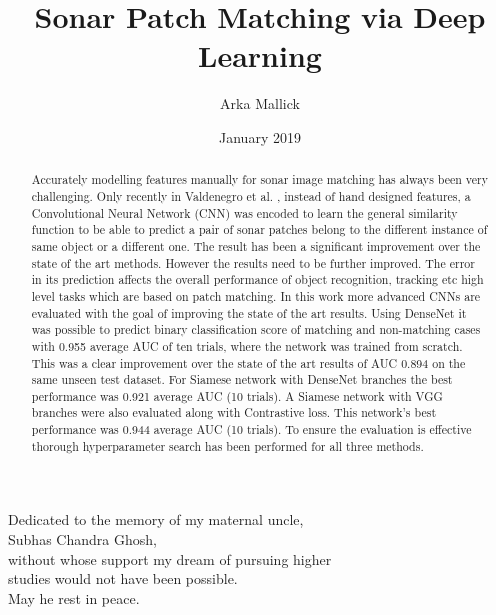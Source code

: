 \documentclass[thesis]{mas_report}
\author{Arka Mallick}
\title{Sonar Patch Matching via Deep Learning}
\date{January 2019}
\begin{document}
\begin{titlepage}
    \maketitle
\end{titlepage}

\pagestyle{plain}


\cleardoublepage
\statementpage

\begin{abstract}
Accurately modelling features manually for sonar image matching has always been very challenging. Only recently in Valdenegro et al. \cite{stateoftheart}, instead of hand designed 
features, a Convolutional Neural Network (CNN) was encoded to learn the general similarity function to be able to predict a pair of sonar patches belong to the different instance of same object or a different one. 
The result has been a significant improvement over the state of the art methods.
However the results need to be further improved. The error in its prediction affects the overall performance of object recognition, tracking etc high level tasks which are based on patch matching. In this work more advanced 
CNNs are evaluated with the goal of improving the state of the art results. Using DenseNet it was possible to predict binary classification score of matching and non-matching cases with 0.955 average AUC of ten trials, 
where the network was trained from scratch. This was a clear improvement over the state of the art \cite{stateoftheart} results of AUC 0.894 on the same unseen test dataset. 
For Siamese network with DenseNet branches the best performance was 0.921 average AUC (10 trials).
A Siamese network with VGG branches were also evaluated along with Contrastive loss. This network's 
best performance was 0.944 average AUC (10 trials). To ensure the evaluation is effective thorough hyperparameter search has been performed for all three methods. 

\end{abstract}

\cleardoublepage


\begin{dedication}
 Dedicated to the memory of my maternal uncle,\\ Subhas Chandra Ghosh,\\
 without whose support my dream of pursuing higher\\ studies would not have been possible.\\
 May he rest in peace.
\end{dedication}
\end{document}
